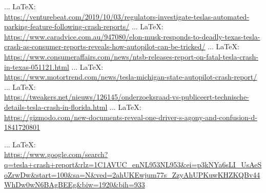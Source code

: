 \begin{thebibliography}{99}
{{{	 ... \LaTeX:\\ \url{https://venturebeat.com/2019/10/03/regulators-investigate-teslas-automated-parking-feature-following-crash-reports/}
	 ... \LaTeX:\\ \url{https://www.caradvice.com.au/947080/elon-musk-responds-to-deadly-texas-tesla-crash-as-consumer-reports-reveals-how-autopilot-can-be-tricked/}
	 ... \LaTeX:\\ \url{https://www.consumeraffairs.com/news/ntsb-releases-report-on-fatal-tesla-crash-in-texas-051121.html}
	 ... \LaTeX:\\ \url{https://www.motortrend.com/news/tesla-michigan-state-autopilot-crash-report/}
	 ... \LaTeX:\\ \url{https://tweakers.net/nieuws/126145/onderzoeksraad-vs-publiceert-technische-details-tesla-crash-in-florida.html}
	 ... \LaTeX:\\ \url{https://gizmodo.com/new-documents-reveal-one-driver-s-agony-and-confusion-d-1841720801}
	
	
	 ... \LaTeX:\\ \url{https://www.google.com/search?q=tesla+crash+report&rlz=1C1AVUC_enNL953NL953&ei=p3kNYa6sLI_UsAeSoZrwDw&start=100&sa=N&ved=2ahUKEwjum77s_ZzyAhUPKuwKHZKQBv44WhDw0wN6BAgBEEg&biw=1920&bih=933}
	
	
	
	
}}}
\end{thebibliography}
